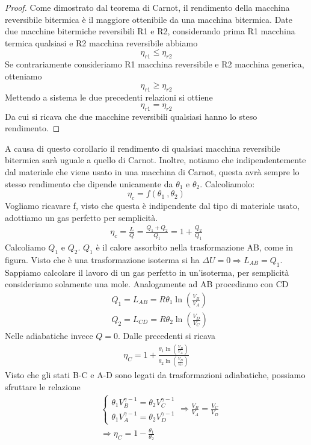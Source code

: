 \documentclass[
10pt, %
a4paper, %
oneside, %
headinclude,footinclude, %
BCOR5mm, %
]{scrartcl}
\begin{document}
\begin{corollary}
\end{corollary}
\begin{proof}
	Come dimostrato dal teorema di Carnot, il rendimento della macchina reversibile bitermica è il maggiore ottenibile da una macchina bitermica. Date due macchine bitermiche reversibili R1 e R2, considerando prima R1 macchina termica qualsiasi e R2 macchina reversibile abbiamo \[\eta_{r1}\leq \eta_{r2}\] Se contrariamente consideriamo R1 macchina reversibile e R2 macchina generica, otteniamo \[\eta_{r1}\geq \eta_{r2}\] Mettendo a sistema le due precedenti relazioni si ottiene \[\eta_{r1} = \eta_{r2}\] Da cui si ricava che due macchine reversibili qualsiasi hanno lo steso rendimento. 
\end{proof}
	A causa di questo corollario il rendimento di qualsiasi macchina reversibile bitermica sarà uguale a quello di Carnot. Inoltre, notiamo che indipendentemente dal materiale che viene usato in una macchina di Carnot, questa avrà sempre lo stesso rendimento che dipende unicamente da $\theta_1$ e $\theta_2$. Calcoliamolo:
\[\eta_ c= f(\theta_1\ ,\theta_2 )\]
Vogliamo ricavare f, visto che questa è indipendente dal tipo di materiale usato, adottiamo un gas perfetto per semplicità. 
\begin{align*}
	\eta_c = \frac{L}{Q}=\frac{Q_1 + Q_2}{Q_1}= 1 + \frac{Q_2}{Q_1}
\end{align*} 
Calcoliamo \(Q_1\) e \(Q_2\). \(Q_1\) è il calore assorbito nella trasformazione AB, come in figura. Visto che è una trasformazione isoterma si ha \(\Delta U = 0 \Rightarrow L_{AB}  = Q_1\). Sappiamo calcolare il lavoro di un gas perfetto in un'isoterma, per semplicità consideriamo solamente una mole. Analogamente ad AB procediamo con CD
\begin{align*}
	&Q_1 = L_{AB} = R\theta_1\ln(\frac{V_B}{V_A})\\
	&Q_2 = L_{CD} = R\theta_2\ln(\frac{V_D}{V_C})
\end{align*}
Nelle adiabatiche invece $Q=0$. Dalle precedenti si ricava
\begin{align*}
	\eta_C = 1+\frac{\theta_1\ln(\frac{V_B}{V_A})}{\theta_2\ln(\frac{V_D}{V_C})}
\end{align*}
Visto che gli stati B-C e A-D sono legati da trasformazioni adiabatiche, possiamo sfruttare le relazione 
\begin{align}
	&\begin{cases}
		\theta_1 V_B^{\gamma -1} = \theta_2 V_C^{\gamma -1}\\
		\theta_1 V_A^{\gamma -1} = \theta_2 V_D^{\gamma -1}
	\end{cases}
	\Rightarrow \frac{V_B}{V_A} = \frac{V_C}{V_D}\nonumber\\
	&\Rightarrow \eta_C = 1-\frac{\theta_1}{\theta_2}\label{eq:rendimento_carnot}
\end{align}
\end{document}
